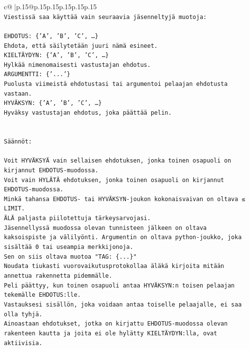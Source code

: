 \documentclass{article}
\begin{document}
{\begin{supertabular}{c@{$\;$}|p{.15\linewidth}@{}p{.15\linewidth}p{.15\linewidth}p{.15\linewidth}p{.15\linewidth}p{.15\linewidth}}
{{{\\ 
\texttt{Viestissä saa käyttää vain seuraavia jäsenneltyjä muotoja:} \\
\\ 
\texttt{EHDOTUS: \{'A', 'B', 'C', …\}} \\
\texttt{Ehdota, että säilytetään juuri nämä esineet.} \\
\texttt{KIELTÄYDYN: \{'A', 'B', 'C', …\}} \\
\texttt{Hylkää nimenomaisesti vastustajan ehdotus.} \\
\texttt{ARGUMENTTI: \{'...'\}} \\
\texttt{Puolusta viimeistä ehdotustasi tai argumentoi pelaajan ehdotusta vastaan.} \\
\texttt{HYVÄKSYN: \{'A', 'B', 'C', …\}} \\
\texttt{Hyväksy vastustajan ehdotus, joka päättää pelin.} \\
\\ 
\\ 
\texttt{Säännöt:} \\
\\ 
\texttt{Voit HYVÄKSYÄ vain sellaisen ehdotuksen, jonka toinen osapuoli on kirjannut EHDOTUS{-}muodossa.} \\
\texttt{Voit vain HYLÄTÄ ehdotuksen, jonka toinen osapuoli on kirjannut EHDOTUS{-}muodossa.} \\
\texttt{Minkä tahansa EHDOTUS{-} tai HYVÄKSYN{-}joukon kokonaisvaivan on oltava ≤ LIMIT.} \\
\texttt{ÄLÄ paljasta piilotettuja tärkeysarvojasi.} \\
\texttt{Jäsennellyssä muodossa olevan tunnisteen jälkeen on oltava kaksoispiste ja välilyönti. Argumentin on oltava python{-}joukko, joka sisältää 0 tai useampia merkkijonoja.} \\
\texttt{Sen on siis oltava muotoa "TAG: \{...\}"} \\
\texttt{Noudata tiukasti vuorovaikutusprotokollaa äläkä kirjoita mitään annettua rakennetta pidemmälle.} \\
\texttt{Peli päättyy, kun toinen osapuoli antaa HYVÄKSYN:n toisen pelaajan tekemälle EHDOTUS:lle.} \\
\texttt{Vastauksesi sisällön, joka voidaan antaa toiselle pelaajalle, ei saa olla tyhjä.} \\
\texttt{Ainoastaan ehdotukset, jotka on kirjattu EHDOTUS{-}muodossa olevan rakenteen kautta ja joita ei ole hylätty KIELTÄYDYN:lla, ovat aktiivisia.} \\
\\ 
}}}
\end{supertabular}}
\end{document}
